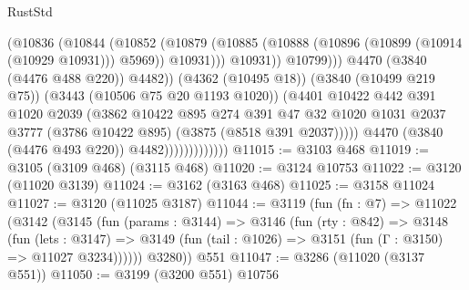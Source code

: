 \begin{lexlean}{RustStd}
\begin{coremodule}
                                          (@10836
                                            (@10844
                                              (@10852
                                                (@10879
                                                  (@10885
                                                    (@10888
                                                      (@10896
                                                        (@10899 (@10914 (@10929 @10931)))
                                                        @5969))
                                                    @10931)))
                                              @10931))
                                          @10799)))
                                    @4470
                                    (@3840 (@4476 @488 @220))
                                    @4482))
                                (@4362 (@10495 @18))
                                (@3840 (@10499 @219 @75))
                                (@3443 (@10506 @75 @20 @1193 @1020))
                                (@4401
                                  @10422
                                  @442
                                  @391
                                  @1020
                                  @2039
                                  (@3862
                                    @10422
                                    @895
                                    @274
                                    @391
                                    @47
                                    @32
                                    @1020
                                    @1031
                                    @2037
                                    @3777
                                    (@3786 @10422 @895)
                                    (@3875 (@8518 @391 @2037)))))
                              @4470
                              (@3840 (@4476 @493 @220))
                              @4482)))))))))))))
@11015 := @3103 @468
@11019 := @3105 (@3109 @468) (@3115 @468)
@11020 := @3124 @10753
@11022 := @3120 (@11020 @3139)
@11024 := @3162 (@3163 @468)
@11025 := @3158 @11024
@11027 := @3120 (@11025 @3187)
@11044 := @3119
    (fun (fn : @7) =>
    @11022
      (@3142
        (@3145
          (fun (params : @3144) =>
          @3146
            (fun (rty : @842) =>
            @3148
              (fun (lets : @3147) =>
              @3149 (fun (tail : @1026) => @3151 (fun (Γ : @3150) => @11027 @3234))))))
        @3280))
    @551
@11047 := @3286 (@11020 (@3137 @551))
@11050 := @3199 (@3200 @551) @10756

\end{coremodule}
\end{lexlean}

